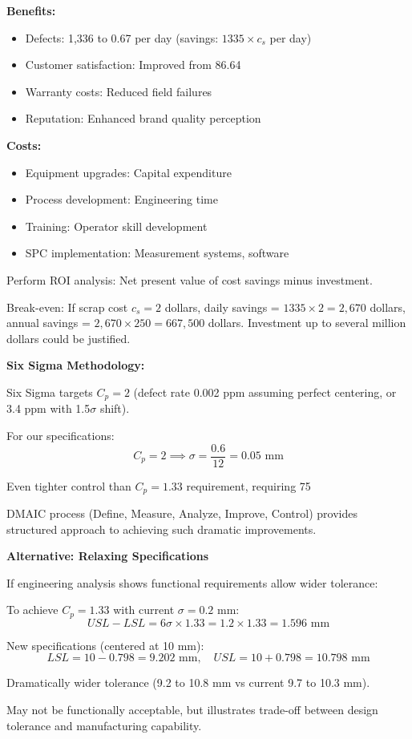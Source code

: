 \documentclass[12pt]{article}
\begin{document}
\begin{explanation}
\textbf{Benefits:}
\begin{itemize}
    \item Defects: 1,336 to 0.67 per day (savings: $1335 \times c_s$ per day)
    \item Customer satisfaction: Improved from 86.64%
    \item Warranty costs: Reduced field failures
    \item Reputation: Enhanced brand quality perception
\end{itemize}

\textbf{Costs:}
\begin{itemize}
    \item Equipment upgrades: Capital expenditure
    \item Process development: Engineering time
    \item Training: Operator skill development
    \item SPC implementation: Measurement systems, software
\end{itemize}

Perform ROI analysis: Net present value of cost savings minus investment.

Break-even: If scrap cost $c_s = 2$ dollars, daily savings = $1335 \times 2 = 2,670$ dollars, annual savings = $2,670 \times 250 = 667,500$ dollars. Investment up to several million dollars could be justified.

\textbf{Six Sigma Methodology:}

Six Sigma targets $C_p = 2$ (defect rate 0.002 ppm assuming perfect centering, or 3.4 ppm with 1.5$\sigma$ shift).

For our specifications:
\[
C_p = 2 \implies \sigma = \frac{0.6}{12} = 0.05 \text{ mm}
\]

Even tighter control than $C_p = 1.33$ requirement, requiring 75%

DMAIC process (Define, Measure, Analyze, Improve, Control) provides structured approach to achieving such dramatic improvements.

\textbf{Alternative: Relaxing Specifications}

If engineering analysis shows functional requirements allow wider tolerance:

To achieve $C_p = 1.33$ with current $\sigma = 0.2$ mm:
\[
USL - LSL = 6\sigma \times 1.33 = 1.2 \times 1.33 = 1.596 \text{ mm}
\]

New specifications (centered at 10 mm):
\[
LSL = 10 - 0.798 = 9.202 \text{ mm}, \quad USL = 10 + 0.798 = 10.798 \text{ mm}
\]

Dramatically wider tolerance (9.2 to 10.8 mm vs current 9.7 to 10.3 mm).

May not be functionally acceptable, but illustrates trade-off between design tolerance and manufacturing capability.

\end{explanation}
\end{document}
